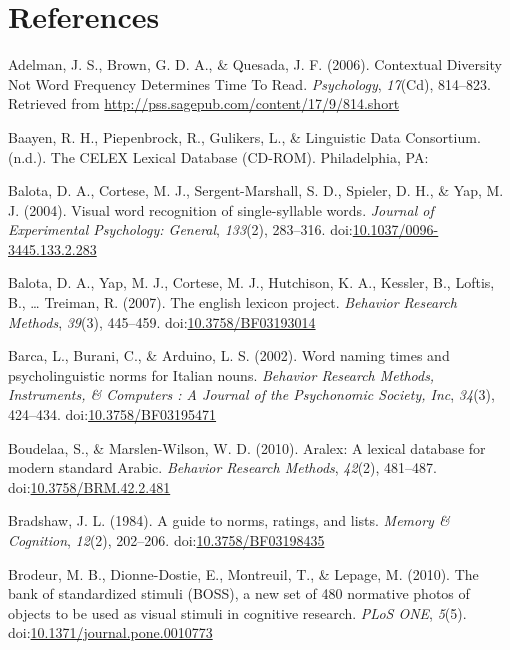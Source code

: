 \documentclass[english,man]{apa6}
\theoremstyle{definition}
\theoremstyle{definition}
\theoremstyle{definition}
\theoremstyle{remark}
\begin{document}
\section{References}\label{references}

\setlength{\parindent}{-0.5in} \setlength{\leftskip}{0.5in}

\hypertarget{refs}{}
\hypertarget{ref-Adelman2006}{}
Adelman, J. S., Brown, G. D. A., \& Quesada, J. F. (2006). Contextual
Diversity Not Word Frequency Determines Time To Read. \emph{Psychology},
\emph{17}(Cd), 814--823. Retrieved from
\url{http://pss.sagepub.com/content/17/9/814.short}

\hypertarget{ref-Baayen}{}
Baayen, R. H., Piepenbrock, R., Gulikers, L., \& Linguistic Data
Consortium. (n.d.). The CELEX Lexical Database (CD-ROM). Philadelphia,
PA:

\hypertarget{ref-Balota2004}{}
Balota, D. A., Cortese, M. J., Sergent-Marshall, S. D., Spieler, D. H.,
\& Yap, M. J. (2004). Visual word recognition of single-syllable words.
\emph{Journal of Experimental Psychology: General}, \emph{133}(2),
283--316.
doi:\href{https://doi.org/10.1037/0096-3445.133.2.283}{10.1037/0096-3445.133.2.283}

\hypertarget{ref-Balota2007}{}
Balota, D. A., Yap, M. J., Cortese, M. J., Hutchison, K. A., Kessler,
B., Loftis, B., \ldots{} Treiman, R. (2007). The english lexicon
project. \emph{Behavior Research Methods}, \emph{39}(3), 445--459.
doi:\href{https://doi.org/10.3758/BF03193014}{10.3758/BF03193014}

\hypertarget{ref-Barca2002}{}
Barca, L., Burani, C., \& Arduino, L. S. (2002). Word naming times and
psycholinguistic norms for Italian nouns. \emph{Behavior Research
Methods, Instruments, \& Computers : A Journal of the Psychonomic
Society, Inc}, \emph{34}(3), 424--434.
doi:\href{https://doi.org/10.3758/BF03195471}{10.3758/BF03195471}

\hypertarget{ref-Boudelaa2010}{}
Boudelaa, S., \& Marslen-Wilson, W. D. (2010). Aralex: A lexical
database for modern standard Arabic. \emph{Behavior Research Methods},
\emph{42}(2), 481--487.
doi:\href{https://doi.org/10.3758/BRM.42.2.481}{10.3758/BRM.42.2.481}

\hypertarget{ref-Bradshaw1984}{}
Bradshaw, J. L. (1984). A guide to norms, ratings, and lists.
\emph{Memory \& Cognition}, \emph{12}(2), 202--206.
doi:\href{https://doi.org/10.3758/BF03198435}{10.3758/BF03198435}

\hypertarget{ref-Brodeur2010}{}
Brodeur, M. B., Dionne-Dostie, E., Montreuil, T., \& Lepage, M. (2010).
The bank of standardized stimuli (BOSS), a new set of 480 normative
photos of objects to be used as visual stimuli in cognitive research.
\emph{PLoS ONE}, \emph{5}(5).
doi:\href{https://doi.org/10.1371/journal.pone.0010773}{10.1371/journal.pone.0010773}
\end{document}
